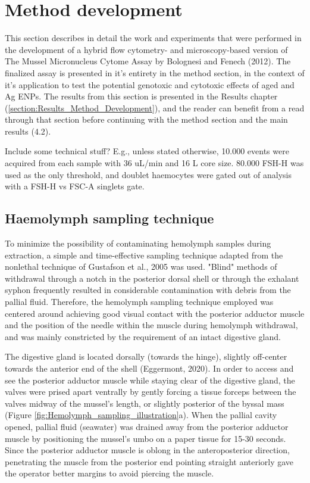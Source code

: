 \section{Method development}
This section describes in detail the work and experiments that were performed in the development of a hybrid flow cytometry- and microscopy-based version of The Mussel Micronucleus Cytome Assay by Bolognesi and Fenech (2012). The finalized assay is presented in it's entirety in the method section, in the context of it's application to test the potential genotoxic and cytotoxic effects of aged  and Ag \acrshort{ENPs}. The results from this section is presented in the Results chapter (\ref{section:Results_Method_Development}), and the reader can benefit from a read through that section before continuing with the method section and the main results (4.2).

Include some technical stuff? E.g., unless stated otherwise, 10.000 events were acquired from each sample with 36 uL/min and 16 \micro L core size. 80.000 FSH-H was used as the only threshold, and doublet haemocytes were gated out of analysis with a FSH-H vs FSC-A singlets gate.

\subsection{Haemolymph sampling technique}
\label{subsection:haemolymph sampling technique}
To minimize the possibility of contaminating hemolymph samples during extraction, a simple and time-effective sampling technique adapted from the nonlethal technique of Gustafson et al., 2005 was used. "Blind" methods of withdrawal through a notch in the posterior dorsal shell or through the exhalant syphon frequently resulted in considerable contamination with debris from the pallial fluid. Therefore, the hemolymph sampling technique employed was centered around achieving good visual contact with the posterior adductor muscle and the position of the needle within the muscle during hemolymph withdrawal, and was mainly constricted by the requirement of an intact digestive gland.

The digestive gland is located dorsally (towards the hinge), slightly off-center towards the anterior end of the shell (Eggermont, 2020). In order to access and see the posterior adductor muscle while staying clear of the digestive gland, the valves were prised apart ventrally by gently forcing a tissue forceps between the valves midway of the mussel's length, or slightly posterior of the byssal mass (Figure \ref{fig:Hemolymph_sampling_illustration}a). When the pallial cavity opened, pallial fluid (seawater) was drained away from the posterior adductor muscle by positioning the mussel's umbo on a paper tissue for 15-30 seconds. Since the posterior adductor muscle is oblong in the anteroposterior direction, penetrating the muscle from the posterior end pointing straight anteriorly gave the operator better margins to avoid piercing the muscle.

